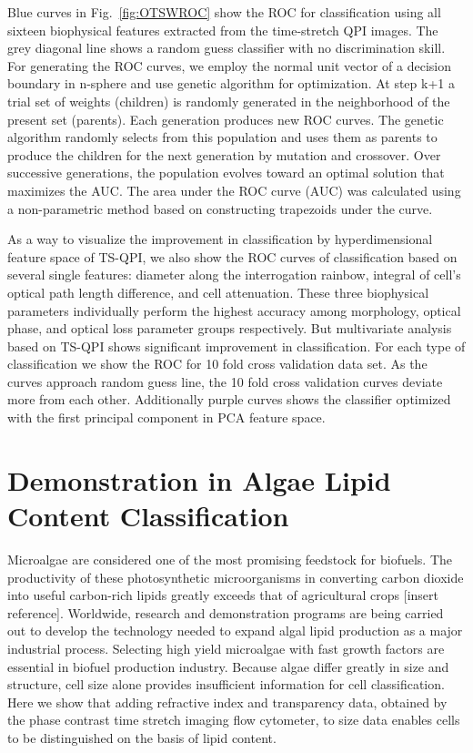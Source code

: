 \documentclass[aps,pra,reprint,superscriptaddress]{revtex4-1}
\begin{document}
Blue curves in Fig.~\ref{fig:OTSWROC} show the ROC for classification using all sixteen biophysical features extracted from the time-stretch QPI images. The grey diagonal line shows a random guess classifier with no discrimination skill. For generating the ROC curves, we employ the normal unit vector of a decision boundary in n-sphere and use genetic algorithm for optimization. At step k+1 a trial set of weights (children) is randomly generated in the neighborhood of the present set (parents). Each generation produces new ROC curves. The genetic algorithm randomly selects from this population and uses them as parents to produce the children for the next generation by mutation and crossover. Over successive generations, the population evolves toward an optimal solution that maximizes the AUC. The area under the ROC curve (AUC) was calculated using a non-parametric method based on constructing trapezoids under the curve.

As a way to visualize the improvement in classification by hyperdimensional feature space of TS-QPI, we also show the ROC curves of classification based on several single features: diameter along the interrogation rainbow, integral of cell’s optical path length difference, and cell attenuation. These three biophysical parameters individually perform the highest accuracy among morphology, optical phase, and optical loss parameter groups respectively. But multivariate analysis based on TS-QPI shows significant improvement in classification. For each type of classification we show the ROC for 10 fold cross validation data set. As the curves approach random guess line, the 10 fold cross validation curves deviate more from each other. Additionally purple curves shows the classifier optimized with the first principal component in PCA feature space.

\section{Demonstration in Algae Lipid Content Classification}

Microalgae are considered one of the most promising feedstock for biofuels. The productivity of these photosynthetic microorganisms in converting carbon dioxide into useful carbon-rich lipids greatly exceeds that of agricultural crops [insert reference]. Worldwide, research and demonstration programs are being carried out to develop the technology needed to expand algal lipid production as a major industrial process. Selecting high yield microalgae with fast growth factors are essential in biofuel production industry. Because algae differ greatly in size and structure, cell size alone provides insufficient information for cell classification. Here we show that adding refractive index and transparency data, obtained by the phase contrast time stretch imaging flow cytometer, to size data enables cells to be distinguished on the basis of lipid content. 
\end{document}
